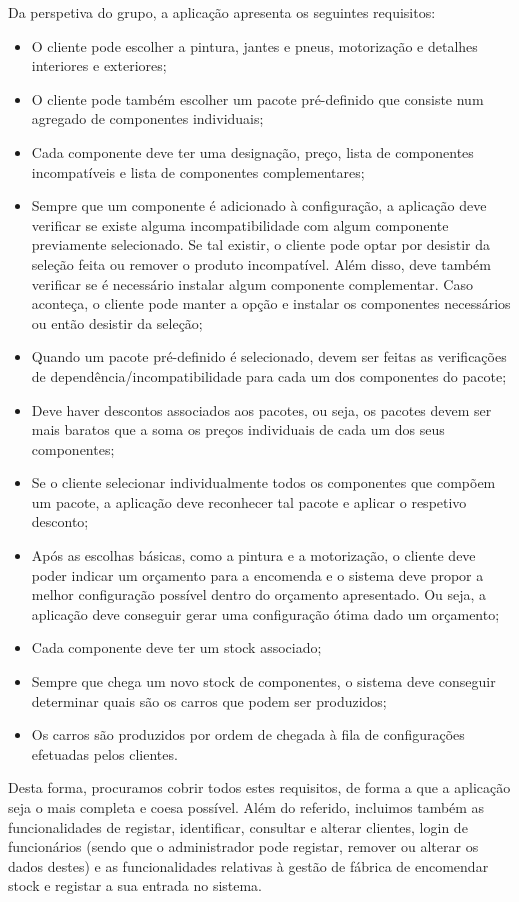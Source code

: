\documentclass[11pt]{article} %
\begin{document}
Da perspetiva do grupo, a aplicação apresenta os seguintes requisitos:
\begin{itemize}
	\item O cliente pode escolher a pintura, jantes e pneus, motorização e detalhes interiores e exteriores;
	\item O cliente pode também escolher um pacote pré-definido que consiste num agregado de componentes individuais;
	\item Cada componente deve ter uma designação, preço, lista de componentes incompatíveis e lista de componentes complementares;
	\item Sempre que um componente é adicionado à configuração, a aplicação deve verificar se existe alguma incompatibilidade com algum componente previamente selecionado. Se tal existir, o cliente pode optar por desistir da seleção feita ou remover o produto incompatível. Além disso, deve também verificar se é necessário instalar algum componente complementar. Caso aconteça, o cliente pode manter a opção e instalar os componentes necessários ou então desistir da seleção;
	\item Quando um pacote pré-definido é selecionado, devem ser feitas as verificações de dependência/incompatibilidade para cada um dos componentes do pacote;
	\item Deve haver descontos associados aos pacotes, ou seja, os pacotes devem ser mais baratos que a soma os preços individuais de cada um dos seus componentes;
	\item Se o cliente selecionar individualmente todos os componentes que compõem um pacote, a aplicação deve reconhecer tal pacote e aplicar o respetivo desconto;
	\item Após as escolhas básicas, como a pintura e a motorização, o cliente deve poder indicar um orçamento para a encomenda e o sistema deve propor a melhor configuração possível dentro do orçamento apresentado. Ou seja, a aplicação deve conseguir gerar uma configuração ótima dado um orçamento;
	\item Cada componente deve ter um stock associado;
	\item Sempre que chega um novo stock de componentes, o sistema deve conseguir determinar quais são os carros que podem ser produzidos;
	\item Os carros são produzidos por ordem de chegada à fila de configurações efetuadas pelos clientes.
\end{itemize}
Desta forma, procuramos cobrir todos estes requisitos, de forma a que a aplicação seja o mais completa e coesa possível. Além do referido, incluimos também as funcionalidades de registar, identificar, consultar e alterar clientes, login de funcionários (sendo que o administrador pode registar, remover ou alterar os dados destes) e as funcionalidades relativas à gestão de fábrica de encomendar stock e registar a sua entrada no sistema.
\end{document}
